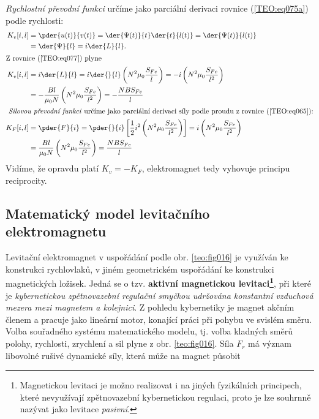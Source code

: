       \emph{Rychlostní převodní funkci} určíme jako parciální derivaci rovnice (\ref{TEO:eq075a}) 
      podle rychlosti: 
      \begin{align}
        K_v[i,l] &= \pder{u(t)}{v(t)} = \der{\Psi(t)}{t}\der{t}{l(t)}          
                  = \der{\Psi(t)}{l(t)}                                        \nonumber \\
                 &= \der{\Psi}{l} = i\der{L}{l}.\label{TEO:eq077} \\
        \shortintertext{Z rovnice (\ref{TEO:eq077}) plyne}
        K_v[i,l] &= i\der{L}{l} = i\der{ }{l}\left(N^2\mu_0\frac{S_{Fe}}{l}\right) 
                  = - i\left(N^2\mu_0\frac{S_{Fe}}{l^2}\right)                  \nonumber \\
                 &= -\frac{Bl}{\mu_0N}\left(N^2\mu_0\frac{S_{Fe}}{l^2}\right)
                  = - \frac{NBS_{Fe}}{l} \label{TEO:eq078}   \\ 
        \shortintertext{\emph{ Silovou převodní funkci} určíme jako parciální derivaci síly podle 
        proudu z rovnice (\ref{TEO:eq065}):}
        K_F[i,l] &= \pder{F}{i} = \pder{ 
        }{i}\left[\frac{1}{2}i^2\left(N^2\mu_0\frac{S_{Fe}}{l^2}\right)\right]  
                  = i\left(N^2\mu_0\frac{S_{Fe}}{l^2}\right)                    \nonumber \\
                 &= \frac{Bl}{\mu_0N}\left(N^2\mu_0\frac{S_{Fe}}{l^2}\right) 
                  = \frac{NBS_{Fe}}{l} \label{TEO:eq079}
      \end{align}
      Vidíme, že opravdu platí \(K_v = - K_F\), elektromagnet tedy vyhovuje principu reciprocity. 
      
    \subsection{Matematický model levitačního elektromagnetu}
      Levitační elektromagnet v uspořádání podle obr. \ref{teo:fig016} je využíván ke konstrukci 
      rychlovlaků, v jiném geometrickém uspořádání ke konstrukci magnetických ložisek. Jedná se o 
      tzv. \textbf{aktivní magnetickou levitaci\footnote{Magnetickou levitaci je možno realizovat i 
      na jiných fyzikálních principech, které nevyužívají zpětnovazební kybernetickou regulaci, 
      proto je lze souhrnně nazývat jako levitace \emph{pasivní}.}}, při které je 
      \emph{kybernetickou zpětnovazební regulační smyčkou udržována konstantní vzduchová mezera 
      mezi magnetem a kolejnici}. Z pohledu kybernetiky je magnet akčním členem a pracuje jako 
      lineární motor, konající práci při pohybu ve svislém směru. Volba souřadného systému 
      matematického modelu, tj. volba kladných směrů polohy, rychlosti, zrychlení a sil plyne z 
      obr. \ref{teo:fig016}. Síla \(F_r\) má význam libovolné rušivé dynamické síly, která může na 
      magnet působit
      
